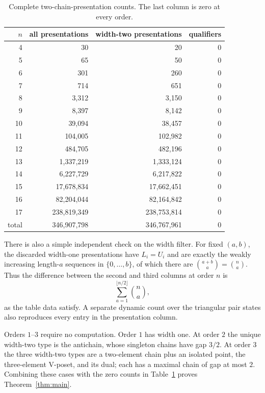 \documentclass[11pt]{article}
\theoremstyle{definition}
\begin{document}
\begin{table}[ht]
\centering
\caption{Complete two-chain-presentation counts.  The last column is zero at
every order.}\label{tab:counts}
\small
\begin{tabular}{r@{\qquad}r@{\qquad}r@{\qquad}r}
\toprule
$n$ & all presentations & width-two presentations & qualifiers\\
\midrule
4  & 30          & 20          & 0\\
5  & 65          & 50          & 0\\
6  & 301         & 260         & 0\\
7  & 714         & 651         & 0\\
8  & 3,312       & 3,150       & 0\\
9  & 8,397       & 8,142       & 0\\
10 & 39,094      & 38,457      & 0\\
11 & 104,005     & 102,982     & 0\\
12 & 484,705     & 482,196     & 0\\
13 & 1,337,219   & 1,333,124   & 0\\
14 & 6,227,729   & 6,217,822   & 0\\
15 & 17,678,834  & 17,662,451  & 0\\
16 & 82,204,044  & 82,164,842  & 0\\
17 & 238,819,349 & 238,753,814 & 0\\
\midrule
total & 346,907,798 & 346,767,961 & 0\\
\bottomrule
\end{tabular}
\end{table}

There is also a simple independent check on the width filter.  For fixed
$(a,b)$, the discarded width-one presentations have $L_i=U_i$ and are exactly
the weakly increasing length-$a$ sequences in $\{0,\ldots,b\}$, of which
there are $\binom{a+b}{a}=\binom{n}{a}$.  Thus the difference between the
second and third columns at order $n$ is
\[
 \sum_{a=1}^{\lfloor n/2\rfloor}\binom{n}{a},
\]
as the table data satisfy.  A separate dynamic count over the triangular
pair states also reproduces every entry in the presentation column.

Orders $1$--$3$ require no computation.  Order $1$ has width one.  At order
$2$ the unique width-two type is the antichain, whose singleton chains have
gap $3/2$.  At order $3$ the three width-two types are a two-element chain
plus an isolated point, the three-element V-poset, and its dual; each has a
maximal chain of gap at most $2$.  Combining these cases with the zero counts
in Table~\ref{tab:counts} proves Theorem~\ref{thm:main}.
\end{document}
